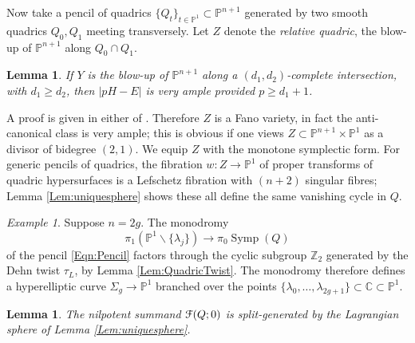 \documentclass[reqno,10pt]{amsart}
\numberwithin{equation}{section}
\newcommand{\bC}{{\mathbb C}}
\newcommand{\bP}{{\mathbb P}}
\newcommand{\bZ}{{\mathbb Z}}
\newcommand{\scrF}{\EuScript{F}}
\newcommand{\Symp}{\operatorname{Symp}}
\newtheorem{Lemma}[thm]{Lemma}
\theoremstyle{remark}
\newtheorem{Example}[thm]{Example}
\begin{document}
Now take a pencil of quadrics $\{Q_t\}_{t \in \bP^1} \subset \bP^{n+1}$ generated by two smooth quadrics $Q_0, Q_1$ meeting transversely.  Let $Z$ denote the \emph{relative quadric}, the blow-up of $\bP^{n+1}$ along $Q_0\cap Q_1$.

\begin{Lemma} \label{Lem:AmpleBlowUp}
If $Y$ is the blow-up of $\bP^{n+1}$ along a $(d_1,d_2)$-complete intersection, with $d_1\geq d_2$,  then $|pH-E|$ is very ample provided $p\geq d_1+1$.
\end{Lemma}

A proof is given in either of \cite{Coppens, Gimigliano-Lorenzini}.   Therefore  $Z$ is a Fano variety, in fact the anti-canonical class is very ample; this is obvious if one views $Z\subset \bP^{n+1} \times \bP^1$ as a divisor of bidegree $(2,1)$.  We equip $Z$ with the monotone symplectic form.  For generic pencils of quadrics, the fibration $w:Z\rightarrow \bP^1$ of proper transforms of quadric hypersurfaces is a Lefschetz fibration with $(n+2)$ singular fibres; Lemma \ref{Lem:uniquesphere} shows these all define the same vanishing cycle in $Q$.


\begin{Example} \label{Ex:LayGround}
Suppose $n=2g$.  The monodromy 
\begin{equation} \label{Eqn:monodromy}
\pi_1(\bP^1 \backslash \{\lambda_j\}) \rightarrow \pi_0\Symp(Q)
\end{equation}
of the pencil \eqref{Eqn:Pencil} factors through the cyclic subgroup $\bZ_{2}$ generated by the Dehn twist $\tau_L$, by Lemma \ref{Lem:QuadricTwist}. The monodromy therefore defines a hyperelliptic curve $\Sigma_g\rightarrow \bP^1$ branched over the points $\{\lambda_0,\ldots, \lambda_{2g+1}\}\subset \bC \subset \bP^1$.
\end{Example}

\begin{Lemma} \label{Lem:QuadricSplitGenerated}
The nilpotent summand  $\scrF(Q;0)$ is split-generated by the Lagrangian sphere of Lemma \ref{Lem:uniquesphere}.
\end{Lemma}
\end{document}
